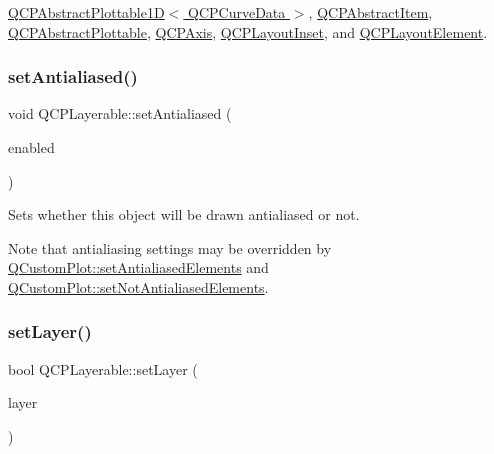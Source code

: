 \hyperlink{class_q_c_p_abstract_plottable1_d_a4611b43bcb6441b2154eb4f4e0a33db2}{Q\+C\+P\+Abstract\+Plottable1\+D$<$ Q\+C\+P\+Curve\+Data $>$}, \hyperlink{class_q_c_p_abstract_item_ae41d0349d68bb802c49104afd100ba2a}{Q\+C\+P\+Abstract\+Item}, \hyperlink{class_q_c_p_abstract_plottable_a38efe9641d972992a3d44204bc80ec1d}{Q\+C\+P\+Abstract\+Plottable}, \hyperlink{class_q_c_p_axis_a63b7103c57fe9acfbce164334ea837f8}{Q\+C\+P\+Axis}, \hyperlink{class_q_c_p_layout_inset_a2eeef7ea1b8340e7c7c2e2fc229df5ea}{Q\+C\+P\+Layout\+Inset}, and \hyperlink{class_q_c_p_layout_element_ae97f483cccedadbf18ea4525ef240ee4}{Q\+C\+P\+Layout\+Element}.

\mbox{\label{class_q_c_p_layerable_a4fd43e89be4a553ead41652565ff0581}} 
\subsubsection{\texorpdfstring{set\+Antialiased()}{setAntialiased()}}
{\footnotesize\ttfamily void Q\+C\+P\+Layerable\+::set\+Antialiased (\begin{DoxyParamCaption}\item[{bool}]{enabled }\end{DoxyParamCaption})}

Sets whether this object will be drawn antialiased or not.

Note that antialiasing settings may be overridden by \hyperlink{class_q_custom_plot_af6f91e5eab1be85f67c556e98c3745e8}{Q\+Custom\+Plot\+::set\+Antialiased\+Elements} and \hyperlink{class_q_custom_plot_ae10d685b5eabea2999fb8775ca173c24}{Q\+Custom\+Plot\+::set\+Not\+Antialiased\+Elements}. \mbox{\label{class_q_c_p_layerable_ab0d0da6d2de45a118886d2c8e16d5a54}} 
\subsubsection{\texorpdfstring{set\+Layer()}{setLayer()}\hspace{0.1cm}{\footnotesize\ttfamily [1/2]}}
{\footnotesize\ttfamily bool Q\+C\+P\+Layerable\+::set\+Layer (\begin{DoxyParamCaption}\item[{\hyperlink{class_q_c_p_layer}{Q\+C\+P\+Layer} $\ast$}]{layer }\end{DoxyParamCaption})}

